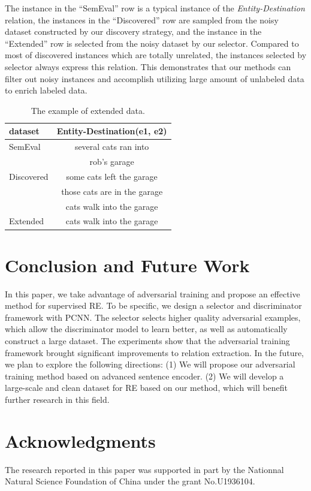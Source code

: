 \documentclass[conference]{IEEEtran}
\begin{document}
The instance in the ``SemEval'' row is a typical instance of the \textit{Entity-Destination} relation,
the instances in the  ``Discovered'' row are sampled from the noisy dataset constructed by our discovery strategy,
and the instance in the ``Extended'' row is selected from the noisy dataset by our selector.
Compared to most of discovered instances which are totally unrelated,
the instances selected by selector always express this relation.
This demonstrates that our methods can filter out noisy instances and accomplish utilizing large amount of unlabeled data to enrich labeled data. 
\begin{table}[h]
\caption{\label{case study} The example of extended data.}
\begin{center}
  \begin{tabular}{lc}
  \hline \textbf{dataset}&\textbf{Entity-Destination(e1, e2)} \\ \hline
  SemEval & several cats ran into\\
  &rob's garage\\ \hline
  Discovered& some cats left the garage\\ 
  & those cats are in the garage\\ 
  & cats walk into the garage\\ \hline
  Extended & cats walk into the garage\\ \hline
  \end{tabular}
\end{center}
  \end{table}

\section{Conclusion and Future Work}
In this paper, we take advantage of adversarial training and propose an effective method for supervised RE.
To be specific, we design a selector and discriminator framework with PCNN. 
The selector selects higher quality adversarial examples, which allow the discriminator model to learn better, as well as automatically construct a large dataset.
The experiments show that the adversarial training framework brought significant improvements to relation extraction.
In the future,  we plan to explore the following directions:
(1) We will propose our adversarial training method based on advanced sentence encoder.
(2) We will develop a large-scale and clean dataset for RE based on our method,  which will benefit further research in this field.

\section*{Acknowledgments}
The research reported in this paper was supported in part by the Nationnal Natural Science Foundation of China under the grant No.U1936104.



\end{document}
